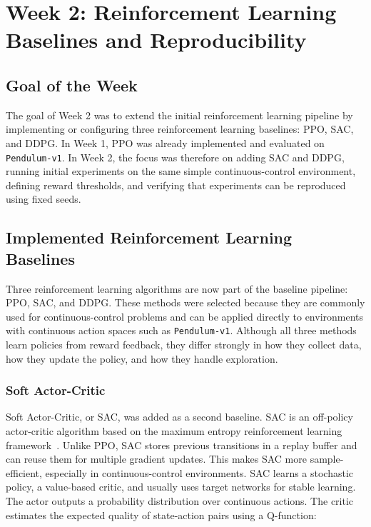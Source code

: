 \documentclass[11pt,a4paper]{article}
\begin{document}
\section{Week 2: Reinforcement Learning Baselines and Reproducibility}

\subsection{Goal of the Week}

The goal of Week 2 was to extend the initial reinforcement learning pipeline by implementing or configuring three reinforcement learning baselines: PPO, SAC, and DDPG. In Week 1, PPO was already implemented and evaluated on \texttt{Pendulum-v1}. In Week 2, the focus was therefore on adding SAC and DDPG, running initial experiments on the same simple continuous-control environment, defining reward thresholds, and verifying that experiments can be reproduced using fixed seeds.

\subsection{Implemented Reinforcement Learning Baselines}

Three reinforcement learning algorithms are now part of the baseline pipeline: PPO, SAC, and DDPG. These methods were selected because they are commonly used for continuous-control problems and can be applied directly to environments with continuous action spaces such as \texttt{Pendulum-v1}. Although all three methods learn policies from reward feedback, they differ strongly in how they collect data, how they update the policy, and how they handle exploration.

\subsubsection{Soft Actor-Critic}

Soft Actor-Critic, or SAC, was added as a second baseline. SAC is an off-policy actor-critic algorithm based on the maximum entropy reinforcement learning framework~\cite{haarnoja2018sac}. Unlike PPO, SAC stores previous transitions in a replay buffer and can reuse them for multiple gradient updates. This makes SAC more sample-efficient, especially in continuous-control environments.
SAC learns a stochastic policy, a value-based critic, and usually uses target networks for stable learning. The actor outputs a probability distribution over continuous actions. The critic estimates the expected quality of state-action pairs using a Q-function:
\end{document}
